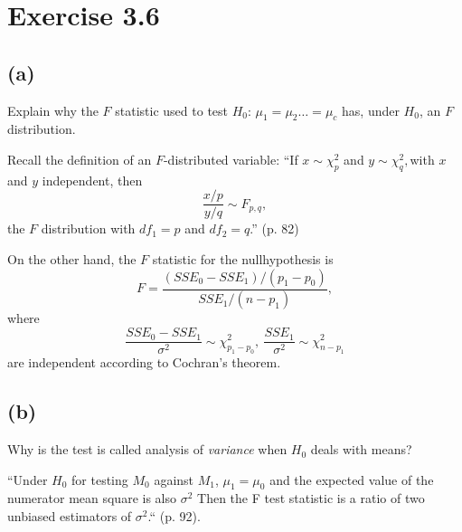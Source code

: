\section*{Exercise 3.6}
\subsection*{(a)}
\begin{framed}
Explain why the $F$ statistic used to test $H_0$: $\mu_1 = \mu_2 \ldots = \mu_c$ has, under $H_0$, an $F$ distribution.
\end{framed}

Recall the definition of an $F$-distributed variable:
``If $x\sim\chi_{p}^{2}$ and $y\sim\chi_{q}^{2},$with $x$ and
$y$ independent, then 
\[
\frac{x/p}{y/q}\sim F_{p,q},
\]
the $F$ distribution with $df_{1}=p$ and $df_{2}=q$.'' (p. 82)

On the other hand, the $F$ statistic for the nullhypothesis is
\[
F=\frac{(SSE_{0}-SSE_{1})/(p_{1}-p_{0})}{SSE_{1}/(n-p_{1})},
\]
where
\[
\frac{SSE_{0}-SSE_{1}}{\sigma^{2}}\sim\chi_{p_{1}-p_{0}}^{2},\:\frac{SSE_{1}}{\sigma^{2}}\sim\chi_{n-p_{1}}^{2}
\]
are independent according to Cochran's theorem.

\subsection*{(b)}
\begin{framed}
Why is the test is called analysis of \textit{variance} when $H_0$ deals with means?
\end{framed}

``Under $H_0$ for testing $M_0$ against $M_1$, $\mu_1 = \mu_0$ and the expected value of the numerator mean square is also $\sigma^2$ Then the F test statistic is a ratio of two unbiased estimators of $\sigma^2$.`` (p. 92). 
